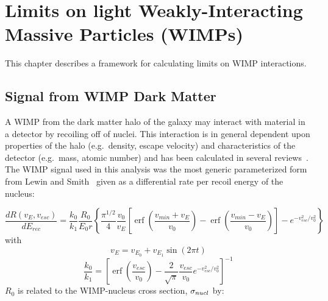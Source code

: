 
\chapter{Limits on light Weakly-Interacting Massive Particles (WIMPs)}
\label{chap:DMWIMPLimits}

	 This chapter describes a framework for calculating limits on WIMP interactions.  

	\section{Signal from WIMP Dark Matter}
	\label{sec:CalcLimitsOnWIMPSignal}	

	A WIMP from the dark matter halo of the galaxy may interact with material in a detector by recoiling off of nuclei.  This interaction is in general dependent upon properties of the halo (e.g.~density, escape velocity) and characteristics of the detector (e.g.~mass, atomic number) and has been calculated in several reviews~\cite{Lew96,Jun96}.  The WIMP signal used in this analysis was the most generic parameterized form from Lewin and Smith~\cite{Lew96} given as a differential rate per recoil energy of the nucleus:

		\begin{equation}
			\frac{dR (v_{E}, v_{esc})}{dE_{rec}} = 
				\frac{k_{0}}{k_{1}} \frac{R_{0}}{E_{0} r} 
				\left\{ 
			 		\frac{\pi^{1/2}}{4} \frac{v_{0}}{v_{E}} 
					\left[ 
						\operatorname{erf} \left( \frac{v_{min} + v_{E}}{v_{0}} \right) - 
							   \operatorname{erf} \left( \frac{v_{min} - v_{E}}{v_{0}} \right) 
					\right] 
					- e^{-v_{esc}^{2}/v_{0}^{2}} 
				\right\}
			\label{eqn:WIMPMasterEqn}
		\end{equation}
with 
		\[
		v_{E} = v_{E_{0}} + v_{E_{1}}\sin (2 \pi t)
		\]
		\[
		\frac{k_{0}}{k_{1}} = \left[
			\operatorname{erf} \left( \frac{v_{esc}}{v_{0}} \right ) - 
			\frac{2}{\sqrt{\pi}} \frac{v_{esc}}{v_{0}} e^{-v_{esc}^{2}/v_{0}^{2}}
		\right]^{-1}
		\]
$R_{0}$ is related to the WIMP-nucleus cross section, $\sigma_{nucl}$ by:

